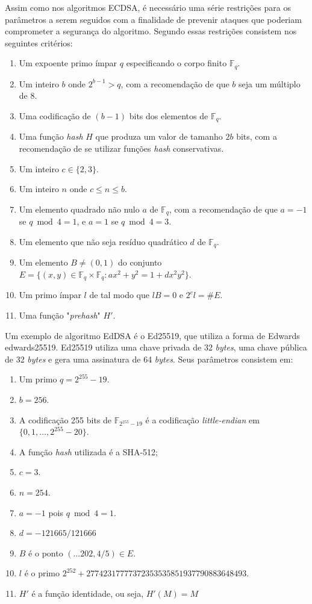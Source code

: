 Assim como nos algoritmos ECDSA, é necessário uma série restrições para os parâmetros a serem seguidos com a finalidade de prevenir ataques que poderiam comprometer a segurança do algoritmo. Segundo  essas restrições consistem nos seguintes critérios: 
\begin{enumerate}
    \item Um expoente primo ímpar $q$ especificando o corpo finito $\mathbb{F}_q$.
    \item Um inteiro $b$ onde $2^{b-1} > q$, com a recomendação de que $b$ seja um múltiplo de 8.
    \item Uma codificação de $(b-1)$ bits dos elementos de $\mathbb{F}_q$.
    \item Uma função \textit{hash} $H$ que produza um valor de tamanho $2b$ bits, com a recomendação de se utilizar funções \textit{hash} conservativas.
    \item Um inteiro $c \in \{2,3\}$.
    \item Um inteiro $n$ onde $c \le n \le b$.
    \item Um elemento quadrado não nulo $a$ de $\mathbb{F}_q$, com a recomendação de que $a = -1$ se $q \bmod{4} = 1$, e $a = 1$ se $q \bmod{4} = 3$.
    \item Um elemento que não seja resíduo quadrático $d$ de $\mathbb{F}_q$.
    \item Um elemento $B \ne (0, 1)$ do conjunto $E = \big\{ (x, y) \in \mathbb{F}_q \times \mathbb{F}_q : ax^2 + y^2 = 1 + dx^2y^2 \big\}$.
    \item Um primo ímpar $l$ de tal modo que $lB = 0$ e $2^cl = \#E$.
    \item Uma função "\textit{prehash}" $H'$.
\end{enumerate}

Um exemplo de algoritmo EdDSA é o Ed25519, que utiliza a forma de Edwards edwards25519. Ed25519 utiliza uma chave privada de 32 \textit{bytes}, uma chave pública de 32 \textit{bytes} e gera uma assinatura de 64 \textit{bytes}. Seus parâmetros consistem em:

\begin{enumerate}
    \item Um primo $ q = 2^{255} - 19$.
    \item $b = 256$.
    \item A codificação 255 bits de $\mathbb{F}_{2^{255}-19}$ é a codificação \textit{little-endian} em $\{ 0,1, \ldots, 2^{255}-20 \}$.
    \item A função \textit{hash} utilizada é a SHA-512;
    \item $c = 3$.
    \item $n = 254$.
    \item $a = -1$ pois $q \bmod{4} = 1$.
    \item $d = -121665/121666$
    \item $B$ é o ponto $(\ldots202, 4/5) \in E$.
    \item $l$ é o primo $2^{252} + 27742317777372353535851937790883648493$.
    \item $H'$ é a função identidade, ou seja, $H'(M) = M$
\end{enumerate}

